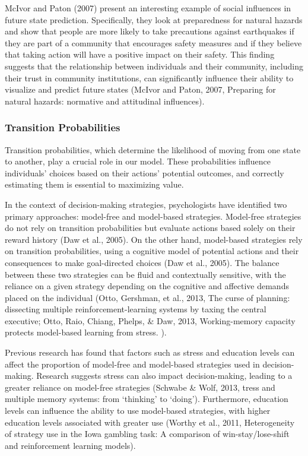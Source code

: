 \documentclass[
]{article}
\begin{document}
McIvor and Paton (2007) present an interesting example of social
influences in future state prediction. Specifically, they look at
preparedness for natural hazards and show that people are more likely to
take precautions against earthquakes if they are part of a community
that encourages safety measures and if they believe that taking action
will have a positive impact on their safety. This finding suggests that
the relationship between individuals and their community, including
their trust in community institutions, can significantly influence their
ability to visualize and predict future states (McIvor and Paton, 2007,
Preparing for natural hazards: normative and attitudinal influences).

\hypertarget{transition-probabilities}{%
\subsubsection{Transition
Probabilities}\label{transition-probabilities}}

Transition probabilities, which determine the likelihood of moving from
one state to another, play a crucial role in our model. These
probabilities influence individuals' choices based on their actions'
potential outcomes, and correctly estimating them is essential to
maximizing value.

In the context of decision-making strategies, psychologists have
identified two primary approaches: model-free and model-based
strategies. Model-free strategies do not rely on transition
probabilities but evaluate actions based solely on their reward history
(Daw et al., 2005). On the other hand, model-based strategies rely on
transition probabilities, using a cognitive model of potential actions
and their consequences to make goal-directed choices (Daw et al., 2005).
The balance between these two strategies can be fluid and contextually
sensitive, with the reliance on a given strategy depending on the
cognitive and affective demands placed on the individual (Otto,
Gershman, et al., 2013, The curse of planning: dissecting multiple
reinforcement-learning systems by taxing the central executive; Otto,
Raio, Chiang, Phelps, \& Daw, 2013, Working-memory capacity protects
model-based learning from stress. ).

Previous research has found that factors such as stress and education
levels can affect the proportion of model-free and model-based
strategies used in decision-making. Research suggests stress can also
impact decision-making, leading to a greater reliance on model-free
strategies (Schwabe \& Wolf, 2013, tress and multiple memory systems:
from `thinking' to `doing'). Furthermore, education levels can influence
the ability to use model-based strategies, with higher education levels
associated with greater use (Worthy et al., 2011, Heterogeneity of
strategy use in the Iowa gambling task: A comparison of
win-stay/lose-shift and reinforcement learning models).
\end{document}
